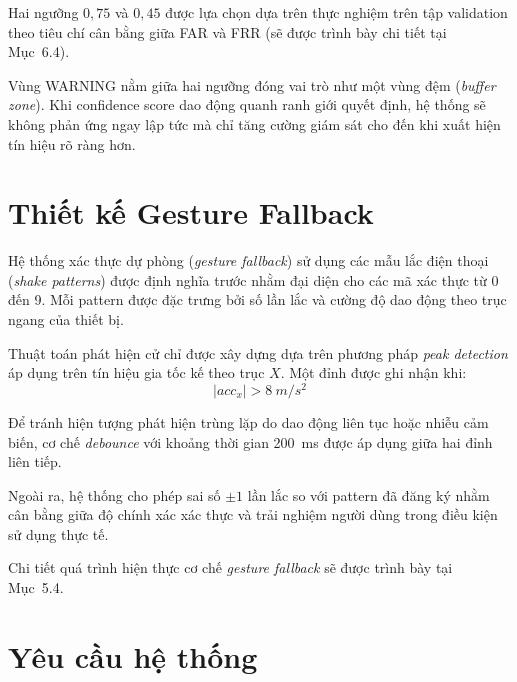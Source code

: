 \documentclass[../DoAn.tex]{subfiles}
\begin{document}
    Hai ngưỡng $0,75$ và $0,45$ được lựa chọn dựa trên thực nghiệm trên tập validation theo tiêu chí cân bằng giữa FAR và FRR (sẽ được trình bày chi tiết tại Mục~6.4).
    
    Vùng WARNING nằm giữa hai ngưỡng đóng vai trò như một vùng đệm (\textit{buffer zone}). Khi confidence score dao động quanh ranh giới quyết định, hệ thống sẽ không phản ứng ngay lập tức mà chỉ tăng cường giám sát cho đến khi xuất hiện tín hiệu rõ ràng hơn.
    
    \section{Thiết kế Gesture Fallback}

    Hệ thống xác thực dự phòng (\textit{gesture fallback}) sử dụng các mẫu lắc điện thoại (\textit{shake patterns}) được định nghĩa trước nhằm đại diện cho các mã xác thực từ 0 đến 9. Mỗi pattern được đặc trưng bởi số lần lắc và cường độ dao động theo trục ngang của thiết bị.
    
    Thuật toán phát hiện cử chỉ được xây dựng dựa trên phương pháp \textit{peak detection} áp dụng trên tín hiệu gia tốc kế theo trục $X$. Một đỉnh được ghi nhận khi:
    \[
    |acc_x| > 8~m/s^2
    \]
    
    Để tránh hiện tượng phát hiện trùng lặp do dao động liên tục hoặc nhiễu cảm biến, cơ chế \textit{debounce} với khoảng thời gian 200~ms được áp dụng giữa hai đỉnh liên tiếp.
    
    Ngoài ra, hệ thống cho phép sai số $\pm 1$ lần lắc so với pattern đã đăng ký nhằm cân bằng giữa độ chính xác xác thực và trải nghiệm người dùng trong điều kiện sử dụng thực tế.
    
    Chi tiết quá trình hiện thực cơ chế \textit{gesture fallback} sẽ được trình bày tại Mục~5.4.
    
    \section{Yêu cầu hệ thống}
\end{document}
